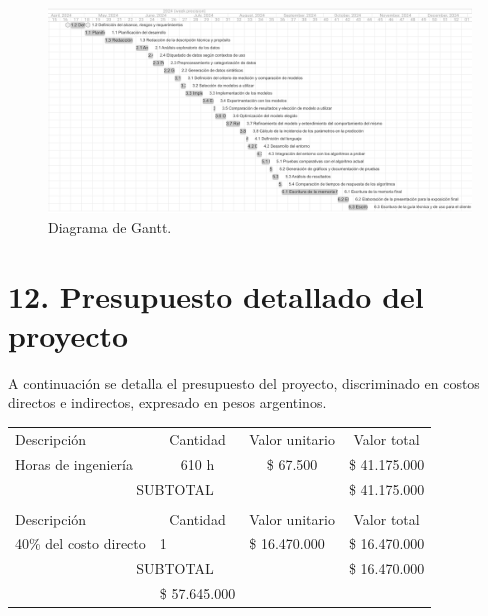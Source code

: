 \documentclass[
11pt, %
]{charter}
\begin{document}
\begin{landscape}
	\begin{figure}[htpb]
		\centering 
		\includegraphics[height=.75\textheight]{./Figuras/gantt_complete.png}
		\caption{Diagrama de Gantt.} %
		\label{fig:gantt_diagram}
	\end{figure}
\end{landscape}

\section{12. Presupuesto detallado del proyecto}
\label{sec:presupuesto}

A continuación se detalla el presupuesto del proyecto, discriminado en costos directos e indirectos, expresado en pesos argentinos.

\begin{table}[htpb]
\centering
\begin{tabularx}{\linewidth}{@{}|X|c|r|r|@{}}
\hline
\rowcolor[HTML]{C0C0C0} 
\multicolumn{4}{|c|}{\cellcolor[HTML]{C0C0C0}COSTOS DIRECTOS} \\ \hline
\rowcolor[HTML]{C0C0C0} 
Descripción &
  \multicolumn{1}{c|}{\cellcolor[HTML]{C0C0C0}Cantidad} &
  \multicolumn{1}{c|}{\cellcolor[HTML]{C0C0C0}Valor unitario} &
  \multicolumn{1}{c|}{\cellcolor[HTML]{C0C0C0}Valor total} \\ \hline
 Horas de ingeniería &
  \multicolumn{1}{c|}{610 h} &
  \multicolumn{1}{c|}{\$ 67.500 } &
  \multicolumn{1}{c|}{\$ 41.175.000 } \\ \hline
\multicolumn{3}{|c|}{SUBTOTAL} &
  \multicolumn{1}{c|}{\$ 41.175.000 } \\ \hline
\rowcolor[HTML]{C0C0C0} 
\multicolumn{4}{|c|}{\cellcolor[HTML]{C0C0C0}COSTOS INDIRECTOS} \\ \hline
\rowcolor[HTML]{C0C0C0} 
Descripción &
  \multicolumn{1}{c|}{\cellcolor[HTML]{C0C0C0}Cantidad} &
  \multicolumn{1}{c|}{\cellcolor[HTML]{C0C0C0}Valor unitario} &
  \multicolumn{1}{c|}{\cellcolor[HTML]{C0C0C0}Valor total} \\ \hline
  40\% del costo directo  &
	\multicolumn{1}{|l|}{1}&
	\multicolumn{1}{|l|}{\$ 16.470.000 }&
	\multicolumn{1}{|l|}{\$ 16.470.000 }
   \\ \hline
\multicolumn{3}{|c|}{SUBTOTAL} &
  \multicolumn{1}{c|}{\$ 16.470.000 } \\ \hline
\rowcolor[HTML]{C0C0C0}
\multicolumn{3}{|c|}{TOTAL} &
\$ 57.645.000
   \\ \hline
\end{tabularx}%
\end{table}
\end{document}
